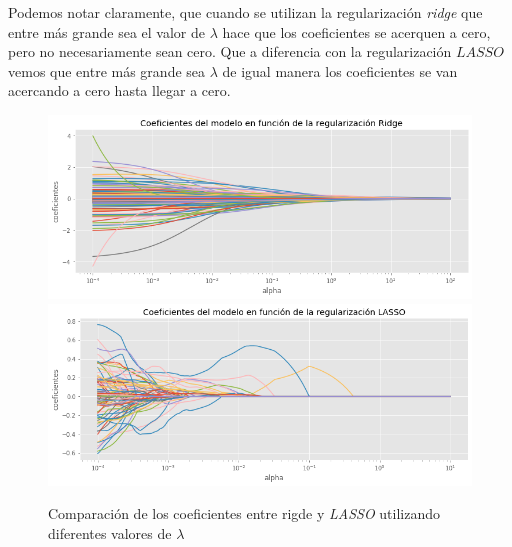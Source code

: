 \documentclass{article}
\begin{document}
Podemos notar claramente, que cuando se utilizan la regularización \textit{ridge} que entre más grande sea el valor de $\lambda$ hace que los coeficientes se acerquen a cero, pero no necesariamente sean cero. Que a diferencia con la regularización $LASSO$ vemos que entre más grande sea $\lambda$ de igual manera los coeficientes se van acercando a cero hasta llegar a cero. 
\begin{figure}[H]
    \centering
    \includegraphics[scale=0.3]{figure/coef_ridge_ejer1.png}
    \includegraphics[scale=0.3]{figure/coef_lasso_ejer1.png}
    \caption{Comparación de los coeficientes entre rigde y \textit{LASSO} utilizando diferentes valores de $\lambda$}
    \label{fig:coef_lasso_ejer1}
\end{figure}
\end{document}
